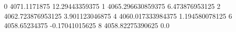0 4071.1171875 12.29443359375
1 4065.296630859375 6.473876953125
2 4062.723876953125 3.901123046875
4 4060.017333984375 1.194580078125
6 4058.65234375 -0.17041015625
8 4058.82275390625 0.0
